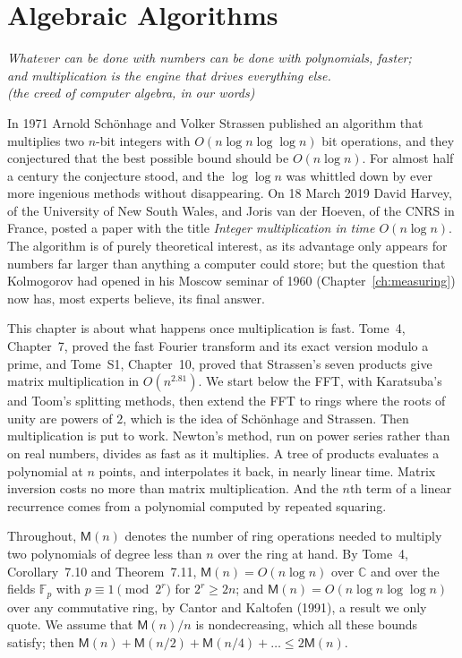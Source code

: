 \chapter{Algebraic Algorithms}\label{ch:algebraic}

\begin{center}\itshape
Whatever can be done with numbers can be done with polynomials, faster;\\
and multiplication is the engine that drives everything else.\\
\upshape(the creed of computer algebra, in our words)
\end{center}

In 1971 Arnold Sch\"onhage and Volker Strassen published an algorithm that multiplies two $n$-bit integers with $O(n\log n\log\log n)$ bit operations, and they conjectured that the
best possible bound should be $O(n\log n)$. For almost half a century the conjecture stood, and the $\log\log n$ was whittled down by ever more ingenious methods without disappearing.
On 18 March 2019 David Harvey, of the University of New South Wales, and Joris van der Hoeven, of the CNRS in France, posted a paper with the title \emph{Integer multiplication in time
$O(n\log n)$}. The algorithm is of purely theoretical interest, as its advantage only appears for numbers far larger than anything a computer could store; but the question that Kolmogorov
had opened in his Moscow seminar of 1960 (Chapter~\ref{ch:measuring}) now has, most experts believe, its final answer.

This chapter is about what happens once multiplication is fast. Tome~4, Chapter~7, proved the fast Fourier transform and its exact version modulo a prime, and Tome~S1, Chapter~10, proved that
Strassen's seven products give matrix multiplication in $O(n^{2.81})$. We start below the FFT, with Karatsuba's and Toom's splitting methods, then extend the FFT to rings where the roots of
unity are powers of $2$, which is the idea of Sch\"onhage and Strassen. Then multiplication is put to work. Newton's method, run on power series rather than on real numbers, divides as fast as it
multiplies. A tree of products evaluates a polynomial at $n$ points, and interpolates it back, in nearly linear time. Matrix inversion costs no more than matrix multiplication. And the $n$th term of a
linear recurrence comes from a polynomial computed by repeated squaring.

Throughout, $\mathsf M(n)$ denotes the number of ring operations needed to multiply two polynomials of degree less than $n$ over the ring at hand. By Tome~4, Corollary~7.10 and Theorem~7.11, $\mathsf M(n)=O(n\log n)$
over $\mathbb C$ and over the fields $\mathbb F_p$ with $p\equiv1\pmod{2^r}$ for $2^r\ge2n$; and $\mathsf M(n)=O(n\log n\log\log n)$ over any commutative ring, by Cantor and Kaltofen (1991), a result we only quote. We
assume that $\mathsf M(n)/n$ is nondecreasing, which all these bounds satisfy; then $\mathsf M(n)+\mathsf M(n/2)+\mathsf M(n/4)+\dots\le2\mathsf M(n)$.

